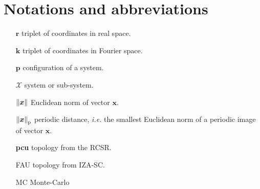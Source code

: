 \section*{Notations and abbreviations}
\begin{itemize}
    \item[$\boldsymbol r$] triplet of coordinates in real space.
    \item[$\boldsymbol k$] triplet of coordinates in Fourier space.
    \item[$\boldsymbol p$] configuration of a system.
    \item[$\mathcal X$] system or sub-system.
    \item[$\left\|\boldsymbol x\right\|$] Euclidean norm of vector $\boldsymbol x$.
    \item[$\left\|\boldsymbol x\right\|_\text{p}$] periodic distance, \textit{i.e.} the smallest Euclidean norm of a periodic image of vector $\boldsymbol x$.
    \item[\bfseries{pcu}] topology from the RCSR.
    \item[FAU] topology from IZA-SC.
    \item[MC] Monte-Carlo
\end{itemize}
